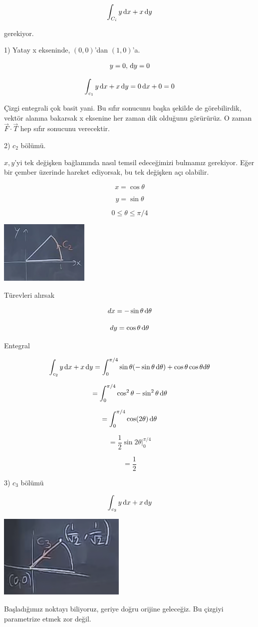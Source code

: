 \documentclass[12pt,fleqn]{article}\usepackage{../../common}
\begin{document}
$$ \int_{C_i} y \,\mathrm{d} x + x \,\mathrm{d} y $$

gerekiyor. 

1) Yatay x ekseninde, $(0,0)$'dan $(1,0)$'a. 

$$ y = 0, \,\mathrm{d} y = 0 $$

$$ \int_{c_1} y \,\mathrm{d} x + x \,\mathrm{d} y = 0 \,\mathrm{d} x + 0 = 0$$

Çizgi entegrali çok basit yani. Bu sıfır sonucunu başka şekilde de
görebilirdik, vektör alanına bakarsak x eksenine her zaman dik olduğunu
görürürüz. O zaman $\vec{F}\cdot \vec{T}$ hep sıfır sonucunu verecektir. 

2) $c_2$ bölümü. 

$x,y$'yi tek değişken bağlamında nasıl temsil edeceğimizi bulmamız
gerekiyor. Eğer bir çember üzerinde hareket ediyorsak, bu tek değişken açı
olabilir. 

$$ x = \cos\theta $$

$$ y = \sin\theta $$

$$ 0 \le \theta \le \pi / 4 $$

\begin{center}
\includegraphics[height=3cm]{20_3.png}
\end{center}

Türevleri alırsak

$$ dx = -\sin\theta \,\mathrm{d}\theta$$

$$ dy = \cos\theta \,\mathrm{d}\theta $$

Entegral

$$
\int_{c_2} y \,\mathrm{d} x + x \,\mathrm{d} y = 
\int_0^{\pi/4} \sin\theta (-\sin\theta \,\mathrm{d}\theta)  + 
\cos\theta \cos\theta d\theta
$$

$$ = \int_0^{\pi/4} \cos^2\theta - \sin^2\theta \,\mathrm{d}\theta $$

$$ = \int_0^{\pi/4} \cos(2\theta) \,\mathrm{d}\theta $$

$$ = \frac{1}{2}\sin 2\theta \bigg|_0^{\pi/4} $$

$$ = \frac{1}{2} $$

3) $c_3$ bölümü

$$ \int_{c_2} y \,\mathrm{d} x + x \,\mathrm{d} y $$
\begin{center}
\includegraphics[height=4cm]{20_4.png}
\end{center}
Başladığımız noktayı biliyoruz, geriye doğru orijine geleceğiz. Bu çizgiyi
parametrize etmek zor değil. 
\end{document}
